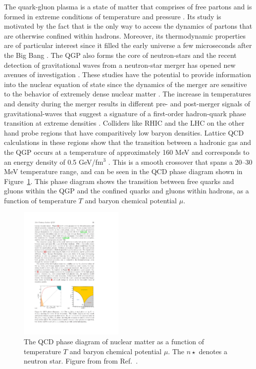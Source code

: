 The quark-gluon plasma is a state of matter that comprises of free partons and is formed in extreme conditions of temperature and pressure \cite{SHURYAK198071}.
Its study is motivated by the fact that is the only way to access the dynamics of partons that are otherwise confined within hadrons.
Moreover, its thermodynamic properties are of particular interest since it filled the early universe a few microseconds after the Big Bang \cite{PhysRevLett.34.1353}.
The QGP also forms the core of neutron-stars \cite{Linde_1979} and the recent detection of gravitational waves from a neutron-star merger \cite{PhysRevLett.119.161101} has opened new avenues of investigation \cite{Han:2018mtj, PhysRevD.99.023009, PhysRevLett.122.061101}.
These studies have the potential to provide information into the nuclear equation of state since the dynamics of the merger are sensitive to the behavior of extremely dense nuclear matter \cite{PhysRevD.86.063001}.
The increase in temperatures and density during the merger results in different pre- and post-merger signals of gravitational-waves that suggest a signature of a first-order hadron-quark phase transition at extreme densities \cite{PhysRevLett.122.061102}.
Colliders like RHIC and the LHC on the other hand probe regions that have comparitively low baryon densities.
Lattice QCD calculations in these regions show that the transition between a hadronic gas and the QGP occurs at a temperature of approximately 160 MeV and corresponds to an energy density of 0.5 GeV/fm$^3$ \cite{Borsanyi:2010bp}.
This is a smooth crossover that spans a 20--30 MeV temperature range, and can be seen in the QCD phase diagram shown in Figure~\ref{fig:qcd_phase}.
This phase diagram shows the transition between free quarks and gluons within the QGP and the confined quarks and gluons within hadrons, as a function of temperature $T$ and baryon chemical potential $\mu$.

\begin{figure}[htbp]
\begin{center}
\includegraphics[width=0.45\textwidth]{figures/theory/qcd_phase}
\caption{The QCD phase diagram of nuclear matter as a function of temperature $T$ and baryon chemical potential $\mu$.
The $n\star$ denotes a neutron star.
Figure from from Ref.~\cite{Kronfeld:2012uk}.}
\label{fig:qcd_phase}
\end{center}
\end{figure}

